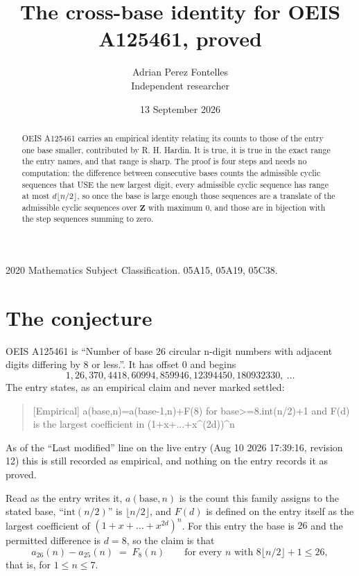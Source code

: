 \documentclass[11pt,a4paper]{article}
\title{The cross-base identity for OEIS A125461, proved}
\author{Adrian Perez Fontelles\\ \small Independent researcher}
\date{13 September 2026}
\theoremstyle{plain}
\theoremstyle{definition}
\begin{document}
\maketitle

\begin{abstract}
OEIS A125461 carries an empirical identity relating its counts to those of the entry one base
smaller, contributed by R. H. Hardin. It is true, it is true in the exact range the entry
names, and that range is sharp. The proof is four steps and needs no computation: the
difference between consecutive bases counts the admissible cyclic sequences that USE the new
largest digit, every admissible cyclic sequence has range at most $d\lfloor n/2\rfloor$, so
once the base is large enough those sequences are a translate of the admissible cyclic
sequences over $\mathbf{Z}$ with maximum $0$, and those are in bijection with the step
sequences summing to zero.
\end{abstract}

\noindent\small 2020 Mathematics Subject Classification. 05A15, 05A19, 05C38.\normalsize

\section{The conjecture}

OEIS A125461 is ``Number of base 26 circular n-digit numbers with adjacent digits differing by 8 or less.''. It has offset $0$ and begins
\[
1, 26, 370, 4418, 60994, 859946, 12394450, 180932330,\ \dots
\]
The entry states, as an empirical claim and never marked settled:
\begin{quote}
[Empirical] a(base,n)=a(base-1,n)+F(8) for base>=8.int(n/2)+1 and F(d) is the largest coefficient in (1+x+...+x\textasciicircum{}(2d))\textasciicircum{}n
\end{quote}
As of the ``Last modified'' line on the live entry (Aug 10 2026 17:39:16, revision 12)
this is still recorded as empirical, and nothing on the entry records it as proved.

Read as the entry writes it, $a(\mathrm{base},n)$ is the count this family assigns to the
stated base, ``$\mathrm{int}(n/2)$'' is $\lfloor n/2\rfloor$, and $F(d)$ is defined on the
entry itself as the largest coefficient of $(1+x+\dots+x^{2d})^{n}$. For this entry
the base is $26$ and the permitted difference is $d=8$, so the claim is that
\[
a_{26}(n)-a_{25}(n)\;=\;F_{8}(n)
\qquad\text{for every } n \text{ with } 8\lfloor n/2\rfloor+1\le26,
\]
that is, for $1\le n\le7$.
\end{document}
